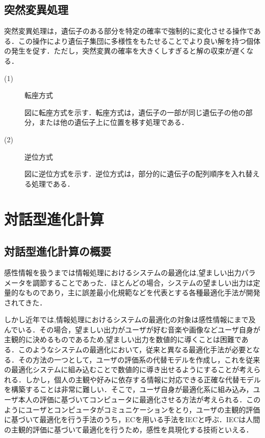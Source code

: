 \clearpage



\subsection{突然変異処理}
\label{sec2.1.5}

突然変異処理は，遺伝子のある部分を特定の確率で強制的に変化させる操作である．この操作により遺伝子集団に多様性をもたせることでより良い解を持つ個体の発生を促す．ただし，突然変異の確率を大きくしすぎると解の収束が遅くなる．

\begin{description}

\item[ (1) ]転座方式

図に転座方式を示す．転座方式は，遺伝子の一部が同じ遺伝子の他の部分，または他の遺伝子上に位置を移す処理である．

\item[ (2) ]逆位方式


図に逆位方式を示す．逆位方式は，部分的に遺伝子の配列順序を入れ替える処理である．


\end{description}


\newpage

\section{対話型進化計算}
\label{sec2.2}

\subsection{対話型進化計算の概要}
\label{sec2.2.1}

感性情報を扱うまでは情報処理におけるシステムの最適化は,望ましい出力パラメータを調節することであった．ほとんどの場合，システムの望ましい出力は定量的なものであり，主に誤差最小化規範などを代表とする各種最適化手法が開発されてきた．

しかし近年では,情報処理におけるシステムの最適化の対象は感性情報にまで及んでいる．その場合，望ましい出力がユーザが好む音楽や画像などユーザ自身が主観的に決めるものであるため,望ましい出力を数値的に導くことは困難である．このようなシステムの最適化において，従来と異なる最適化手法が必要となる．その方法の一つとして，ユーザの評価系の代替モデルを作成し，これを従来の最適化システムに組み込むことで数値的に導き出せるようにすることが考えられる．しかし，個人の主観や好みに依存する情報に対応できる正確な代替モデルを構築することは非常に難しい．そこで，ユーザ自身が最適化系に組み込み，ユーザ本人の評価に基づいてコンピュータに最適化させる方法が考えられる．このようにユーザとコンピュータがコミュニケーションをとり，ユーザの主観的評価に基づいて最適化を行う手法のうち，ECを用いる手法をIECと呼ぶ．IECは人間の主観的評価に基づいて最適化を行うため，感性を具現化する技術といえる．

